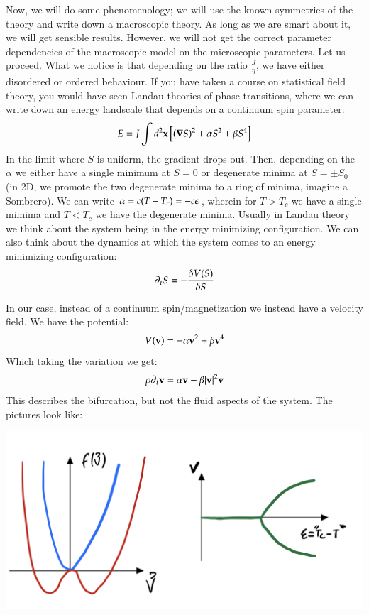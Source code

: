 Now, we will do some phenomenology; we will use the known symmetries of the theory and write down a macroscopic theory. As long as we are smart about it, we will get sensible results. However, we will not get the correct parameter dependencies of the macroscopic model on the microscopic parameters. Let us proceed. What we notice is that depending on the ratio $\frac{J}{\eta}$, we have either disordered or ordered behaviour. If you have taken a course on statistical field theory, you would have seen Landau theories of phase transitions, where we can write down an energy landscale that depends on a continuum spin parameter:
\begin{equation}
    E = J\int d^2\v{x}\left[(\nabla S)^2 + \alpha S^2 + \beta S^4\right]
\end{equation}
In the limit where $S$ is uniform, the gradient drops out. Then, depending on the $\alpha$ we either have a single minimum at $S = 0$ or degenerate minima at $S = \pm S_0$ (in 2D, we promote the two degenerate minima to a ring of minima, imagine a Sombrero). We can write $\alpha = c(T - T_c) = -c\epsilon$, wherein for $T > T_c$ we have a single mimima and $T < T_c$ we have the degenerate minima. Usually in Landau theory we think about the system being in the energy minimizing configuration. We can also think about the dynamics at which the system comes to an energy minimizing configuration:
\begin{equation}
    \partial_t S = -\frac{\delta V(S)}{\delta S}
\end{equation}

In our case, instead of a continuum spin/magnetization we instead have a velocity field. We have the potential:
\begin{equation}
    V(\mathbf{v}) = -\alpha \mathbf{v}^2 + \beta \mathbf{v}^4
\end{equation}
Which taking the variation we get:
\begin{equation}\label{eq:TTbifurcationterms}
    \rho \partial_t \mathbf{v} = \alpha \mathbf{v} - \beta \lvert \mathbf{v} \rvert^2 \mathbf{v}
\end{equation}
This describes the bifurcation, but not the fluid aspects of the system. The pictures look like:

\begin{center}
    \includegraphics[scale=0.35]{Lectures/Images/lec8-bifurcation.png}
\end{center}

